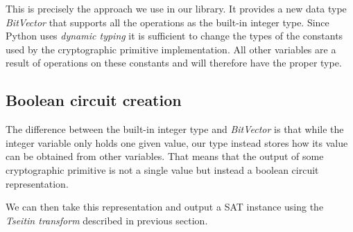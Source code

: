 This is precisely the approach we use in our library.
It provides a new data type \emph{BitVector} that supports all the operations as the built-in integer type.
Since Python uses \emph{dynamic typing} it is sufficient to change the types of the constants used by the cryptographic primitive implementation.
All other variables are a result of operations on these constants and will therefore have the proper type.

\subsection{Boolean circuit creation}
The difference between the built-in integer type and \emph{BitVector} is that while the integer variable only holds one given value, our type instead stores how its value can be obtained from other variables.
That means that the output of some cryptographic primitive is not a single value but instead a boolean circuit representation.

We can then take this representation and output a SAT instance using the \emph{Tseitin transform} described in previous section.

